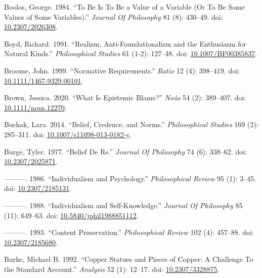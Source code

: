 \documentclass[
  10pt,
  letterpaper,
  DIV=11,
  numbers=noendperiod,
  twoside]{scrartcl}
\newlength{\cslhangindent}
\newenvironment{CSLReferences}[2] %
 {\begin{list}{}{%
  \setlength{\itemindent}{0pt}
  \setlength{\leftmargin}{0pt}
  \setlength{\parsep}{0pt}
  \ifodd #1
   \setlength{\leftmargin}{\cslhangindent}
   \setlength{\itemindent}{-1\cslhangindent}
  \fi
  \setlength{\itemsep}{#2\baselineskip}}}
 {\end{list}}
\begin{document}
\begin{CSLReferences}{1}{0}
Boolos, George. 1984. {``To Be Is To Be a Value of a Variable (Or To Be
Some Values of Some Variables).''} \emph{Journal Of Philosophy} 81 (8):
430--49. doi: \href{https://doi.org/10.2307/2026308}{10.2307/2026308}.

Boyd, Richard. 1991. {``Realism, Anti-Foundationalism and the Enthusiasm
for Natural Kinds.''} \emph{Philosophical Studies} 61 (1-2): 127--48.
doi: \href{https://doi.org/10.1007/BF00385837}{10.1007/BF00385837}.

Broome, John. 1999. {``Normative Requirements.''} \emph{Ratio} 12 (4):
398--419. doi:
\href{https://doi.org/10.1111/1467-9329.00101}{10.1111/1467-9329.00101}.

Brown, Jessica. 2020. {``What Is Epistemic Blame?''} \emph{Noûs} 54 (2):
389--407. doi:
\href{https://doi.org/10.1111/nous.12270}{10.1111/nous.12270}.

Buchak, Lara. 2014. {``Belief, Credence, and Norms.''}
\emph{Philosophical Studies} 169 (2): 285--311. doi:
\href{https://doi.org/10.1007/s11098-013-0182-y}{10.1007/s11098-013-0182-y}.

Burge, Tyler. 1977. {``Belief De Re.''} \emph{Journal Of Philosophy} 74
(6): 338--62. doi:
\href{https://doi.org/10.2307/2025871}{10.2307/2025871}.

---------. 1986. {``Individualism and Psychology.''} \emph{Philosophical
Review} 95 (1): 3--45. doi:
\href{https://doi.org/10.2307/2185131}{10.2307/2185131}.

---------. 1988. {``Individualism and Self-Knowledge.''} \emph{Journal
Of Philosophy} 85 (11): 649--63. doi:
\href{https://doi.org/10.5840/jphil1988851112}{10.5840/jphil1988851112}.

---------. 1993. {``Content Preservation.''} \emph{Philosophical Review}
102 (4): 457--88. doi:
\href{https://doi.org/10.2307/2185680}{10.2307/2185680}.

Burke, Michael B. 1992. {``Copper Statues and Pieces of Copper: A
Challenge To the Standard Account.''} \emph{Analysis} 52 (1): 12--17.
doi: \href{https://doi.org/10.2307/3328875}{10.2307/3328875}.


\end{CSLReferences}
\end{document}
